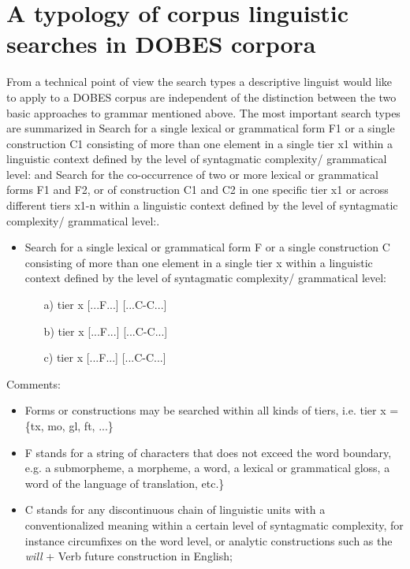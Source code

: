 \section{A typology of corpus linguistic searches in DOBES corpora}
\label{bouda:sec:typologyofsearches}

From a technical point of view the search types a descriptive linguist would like to apply to a DOBES corpus are independent of the distinction between the two basic approaches to grammar mentioned above. The most important search types are summarized in Search for a single lexical or grammatical form F1 or a single construction C1 consisting of more than one element in a single tier x1 within a linguistic context defined by the level of syntagmatic complexity/ grammatical level: and Search for the co-occurrence of two or more lexical or grammatical forms F1 and F2, or of construction C1 and C2 in one specific tier x1 or across different tiers x1-n within a linguistic context defined by the level of syntagmatic complexity/ grammatical level:.

\ea
 \begin{itemize}
\item \label{bkm:Ref283731549}Search for a single lexical or grammatical form F or a single construction C consisting of more than one element in a single tier x within a linguistic context defined by the level of syntagmatic complexity/ grammatical level:

 \begin{enumerate}
 \item[a)] tier x [...F...] [...C-C...]

 \item[b)] tier x [...F...] [...C-C...]

 \item[c)] tier x [...F...] [...C-C...]

 \end{enumerate}
\end{itemize}
Comments:

\begin{itemize}
\item Forms or constructions may be searched within all kinds of tiers, i.e. tier x = \{tx, mo, gl, ft, ...\}

\item F stands for a string of characters that does not exceed the word boundary, e.g. a submorpheme, a morpheme, a word, a lexical or grammatical gloss, a word of the language of translation, etc.\}

\item C stands for any discontinuous chain of linguistic units with a conventionalized meaning within a certain level of syntagmatic complexity, for instance circumfixes on the word level, or analytic constructions such as the \textit{will} + Verb future construction in English;
\end{itemize}

